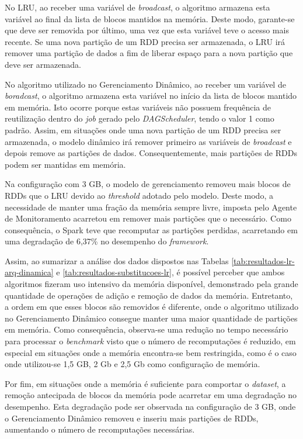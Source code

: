 No LRU, ao receber uma variável de \textit{broadcast}, o algoritmo armazena esta variável ao final da lista de blocos mantidos na memória. Deste modo, garante-se que deve ser removida por último, uma vez que esta variável teve o acesso mais recente. Se uma nova partição de um RDD precisa ser armazenada, o LRU irá remover uma partição de dados a fim de liberar espaço para a nova partição que deve ser armazenada.

No algoritmo utilizado no Gerenciamento Dinâmico, ao receber um variável de \textit{boradcast}, o algoritmo armazena esta variável no início da lista de blocos mantido em memória. Isto ocorre porque estas variáveis não possuem frequência de reutilização dentro do \textit{job} gerado pelo \textit{DAGScheduler}, tendo o valor 1 como padrão. Assim, em situações onde uma nova partição de um RDD precisa ser armazenada, o modelo dinâmico irá remover primeiro as variáveis de \textit{broadcast} e depois remove as partições de dados. Consequentemente, mais partições de RDDs podem ser mantidas em memória.

Na configuração com 3 GB, o modelo de gerenciamento removeu mais blocos de RDDs que o LRU devido ao \textit{threshold} adotado pelo modelo. Deste modo, a necessidade de manter uma fração da memória sempre livre, imposta pelo Agente de Monitoramento acarretou em remover mais partições que o necessário. Como consequência, o Spark teve que recomputar as partições perdidas, acarretando em uma degradação de 6,37\% no desempenho do \textit{framework}.

Assim, ao sumarizar a análise dos dados dispostos nas Tabelas \ref{tab:resultados-lr-arq-dinamica} e \ref{tab:resultados-substitucoes-lr}, é possível perceber que ambos algoritmos fizeram uso intensivo da memória disponível, demonstrado pela grande quantidade de operações de adição e remoção de dados da memória. Entretanto, a ordem em que esses blocos são removidos é diferente, onde o algoritmo utilizado no Gerenciamento Dinâmico consegue manter uma maior quantidade de partições em memória. Como consequência, observa-se uma redução no tempo necessário para processar o \textit{benchmark} visto que o número de recomputações é reduzido, em especial em situações onde a memória encontra-se bem restringida, como é o caso onde utilizou-se 1,5 GB, 2 Gb e 2,5 Gb como configuração de memória.

Por fim, em situações onde a memória é suficiente para comportar o \textit{dataset}, a remoção antecipada de blocos da memória pode acarretar em uma degradação no desempenho. Esta degradação pode ser observada na configuração de 3 GB, onde o Gerenciamento Dinâmico removeu e inseriu mais partições de RDDs, aumentando o número de recomputações necessárias.